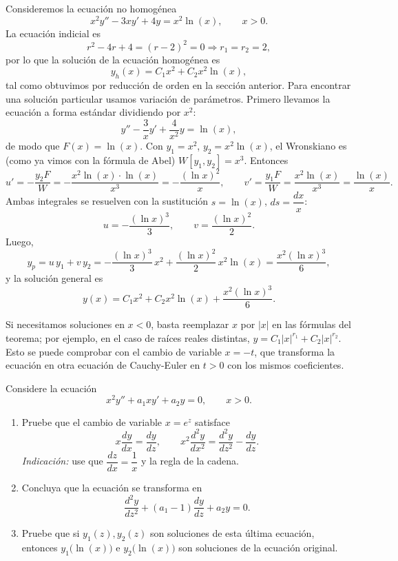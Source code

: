 \begin{example}
    Consideremos la ecuaci\'on no homog\'enea
    \[
    x^2y''-3xy'+4y=x^2\ln(x),\qquad x>0.
    \]
    La ecuaci\'on indicial es
    \[
    r^2-4r+4=(r-2)^2=0\Longrightarrow r_1=r_2=2,
    \]
    por lo que la soluci\'on de la ecuaci\'on homog\'enea es
    \[
    y_h(x)=C_1x^2+C_2x^2\ln(x),
    \]
    tal como obtuvimos por reducci\'on de orden en la secci\'on anterior. Para encontrar una soluci\'on particular usamos variaci\'on de par\'ametros. Primero llevamos la ecuaci\'on a forma est\'andar dividiendo por $x^2$:
    \[
    y''-\dfrac{3}{x}y'+\dfrac{4}{x^2}y=\ln(x),
    \]
    de modo que $F(x)=\ln(x)$. Con $y_1=x^2$, $y_2=x^2\ln(x)$, el Wronskiano es (como ya vimos con la f\'ormula de Abel) $W[y_1,y_2]=x^3$. Entonces
    \[
    u'=-\dfrac{y_2F}{W}=-\dfrac{x^2\ln(x)\cdot\ln(x)}{x^3}=-\dfrac{(\ln x)^2}{x},\qquad v'=\dfrac{y_1F}{W}=\dfrac{x^2\ln(x)}{x^3}=\dfrac{\ln(x)}{x}.
    \]
    Ambas integrales se resuelven con la sustituci\'on $s=\ln(x)$, $ds=\dfrac{dx}{x}$:
    \[
    u=-\dfrac{(\ln x)^3}{3},\qquad v=\dfrac{(\ln x)^2}{2}.
    \]
    Luego,
    \[
    y_p=u\,y_1+v\,y_2=-\dfrac{(\ln x)^3}{3}\,x^2+\dfrac{(\ln x)^2}{2}\,x^2\ln(x)=\dfrac{x^2(\ln x)^3}{6},
    \]
    y la soluci\'on general es
    \[
    y(x)=C_1x^2+C_2x^2\ln(x)+\dfrac{x^2(\ln x)^3}{6}.
    \]
\end{example}

\begin{remark}[El caso $x<0$]
    Si necesitamos soluciones en $x<0$, basta reemplazar $x$ por $|x|$ en las f\'ormulas del teorema; por ejemplo, en el caso de ra\'ices reales distintas, $y=C_1|x|^{r_1}+C_2|x|^{r_2}$. Esto se puede comprobar con el cambio de variable $x=-t$, que transforma la ecuaci\'on en otra ecuaci\'on de Cauchy-Euler en $t>0$ con los mismos coeficientes.
\end{remark}

\begin{exercise}
    Considere la ecuaci\'on
    \[
    x^2y''+a_1xy'+a_2y=0,\qquad x>0.
    \]
    \begin{enumerate}[label=\alph*)]
        \item Pruebe que el cambio de variable $x=e^z$ satisface
        \[
        x\dfrac{dy}{dx}=\dfrac{dy}{dz},\qquad x^2\dfrac{d^2y}{dx^2}=\dfrac{d^2y}{dz^2}-\dfrac{dy}{dz}.
        \]
        \textit{Indicaci\'on:} use que $\dfrac{dz}{dx}=\dfrac{1}{x}$ y la regla de la cadena.
        \item Concluya que la ecuaci\'on se transforma en
        \[
        \dfrac{d^2y}{dz^2}+(a_1-1)\dfrac{dy}{dz}+a_2y=0.
        \]
        \item Pruebe que si $y_1(z),y_2(z)$ son soluciones de esta \'ultima ecuaci\'on, entonces $y_1\big(\ln(x)\big)$ e $y_2\big(\ln(x)\big)$ son soluciones de la ecuaci\'on original.
    \end{enumerate}
\end{exercise}

